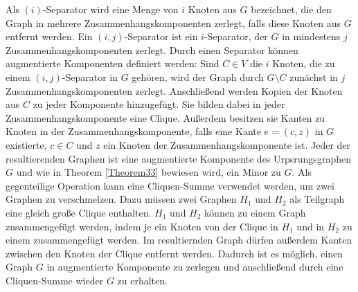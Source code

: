 Als $(i)$-Separator wird eine Menge von $i$ Knoten aus $G$ bezeichnet, die den Graph in mehrere Zusammenhangskomponenten zerlegt, falls diese Knoten aus $G$ entfernt werden.
Ein $(i, j)$-Separator ist ein $i$-Separator, der $G$ in mindestens $j$ Zusammenhangskomponenten zerlegt. %
Durch einen Separator können augmentierte Komponenten definiert werden:
Sind $C \in V$ die $i$ Knoten, die zu einem $(i, j)$-Separator in $G$ gehören, wird der Graph durch $G \setminus C$ zunächst in $j$ Zusammenhangskomponenten zerlegt.
Anschließend werden Kopien der Knoten aus $C$ zu jeder Komponente hinzugefügt.
Sie bilden dabei in jeder Zusammenhangskomponente eine Clique.
Außerdem besitzen sie Kanten zu Knoten in der Zusammenhangskomponente, falls eine Kante $e = (c, z)$ in $G$ existierte, $c \in C$ und $z$ ein Knoten der Zusammenhangskomponente ist.
Jeder der resultierenden Graphen ist eine augmentierte Komponente des Urpsrungsgraphen $G$ und wie in Theorem \ref{Theorem33} bewiesen wird, \evtl ein Minor zu $G$. %
Als gegenteilige Operation kann eine Cliquen-Summe verwendet werden, um zwei Graphen zu verschmelzen.
Dazu müssen zwei Graphen $H_1$ und $H_2$ als Teilgraph eine gleich große Clique enthalten.
$H_1$ und $H_2$ können zu einem Graph zusammengefügt werden, indem je ein Knoten von der Clique in $H_1$ und in $H_2$ zu einem zusammengefügt werden.
Im resultiernden Graph dürfen außerdem Kanten zwischen den Knoten der Clique entfernt werden.
Dadurch ist es möglich, einen Graph $G$ in augmentierte Komponente zu zerlegen und anschließend durch eine Cliquen-Summe wieder $G$ zu erhalten.
